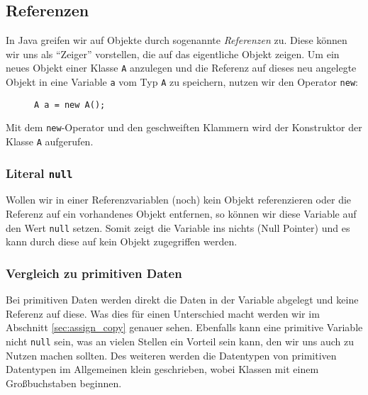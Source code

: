 \subsection{Referenzen}
	In Java greifen wir auf Objekte durch sogenannte \textit{Referenzen} zu. Diese können wir uns als \enquote{Zeiger} vorstellen, die auf das eigentliche Objekt zeigen. Um ein neues Objekt einer Klasse \lstinline|A| anzulegen und die Referenz auf dieses neu angelegte Objekt in eine Variable \lstinline|a| vom Typ \lstinline|A| zu speichern, nutzen wir den Operator \lstinline|new|:
	\begin{figure}[H]
		\centering
		\lstinline|A a = new A();|
	\end{figure}
	Mit dem \lstinline|new|-Operator und den geschweiften Klammern wird der Konstruktor der Klasse \lstinline|A| aufgerufen.
	
	\subsubsection{Literal \texttt{null}}
		Wollen wir in einer Referenzvariablen (noch) kein Objekt referenzieren oder die Referenz auf ein vorhandenes Objekt entfernen, so können wir diese Variable auf den Wert \lstinline|null| setzen. Somit zeigt die Variable ins nichts (Null Pointer) und es kann durch diese auf kein Objekt zugegriffen werden.
		
	
	\subsubsection{Vergleich zu primitiven Daten}
		Bei primitiven Daten werden direkt die Daten in der Variable abgelegt und keine Referenz auf diese. Was dies für einen Unterschied macht werden wir im Abschnitt \ref{sec:assign_copy} genauer sehen. Ebenfalls kann eine primitive Variable nicht \lstinline|null| sein, was an vielen Stellen ein Vorteil sein kann, den wir uns auch zu Nutzen machen sollten. Des weiteren werden die Datentypen von primitiven Datentypen im Allgemeinen klein geschrieben, wobei Klassen mit einem Großbuchstaben beginnen.
	
